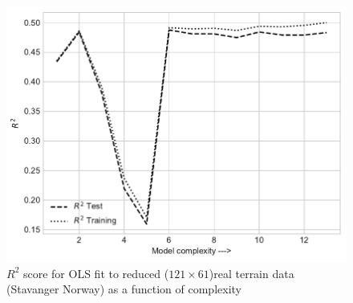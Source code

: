 \documentclass[%
oneside,                 %
final,                   %
10pt]{article}
\begin{document}
\begin{appendices}
\begin{figure}[!h]
        \centering 
         \includegraphics[scale=0.7]{../Results/Part_g/OLSr2_terraintest1.pdf} 
        \caption{$R^2$ score for OLS fit to reduced ($121 \times 61$)real terrain data (Stavanger Norway) as a function of complexity}
        \label{fig:realdatapoly1}   
\end{figure}  


\end{appendices}
\end{document}
